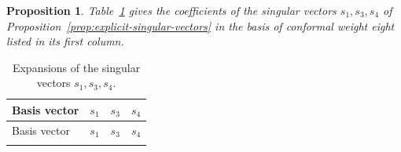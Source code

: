 \documentclass[11pt]{amsart}
\numberwithin{equation}{section}
\newtheorem{proposition}[theorem]{Proposition}
\theoremstyle{definition}
\theoremstyle{remark}
\begin{document}
\begin{proposition}\label{prop:pbw-singular-vectors}
Table~\ref{tab:weight-eight-pbw} gives the coefficients of the singular
vectors $s_1,s_3,s_4$ of Proposition~\ref{prop:explicit-singular-vectors}
in the basis of conformal weight eight listed in its first column.
\end{proposition}
\begingroup
\small
\renewcommand{\arraystretch}{1.15}
\setlength{\LTleft}{\fill}
\setlength{\LTright}{\fill}

\begin{longtable}{@{}lrrr@{}}
	\caption{Expansions of the singular vectors
		$s_1,s_3,s_4$.}
\label{tab:weight-eight-pbw}\\
\toprule
Basis vector & $s_1$ & $s_3$ & $s_4$\\
\midrule
\endfirsthead

\toprule
Basis vector & $s_1$ & $s_3$ & $s_4$\\
\midrule
\endhead

\endfoot
\bottomrule
\endlastfoot


\end{longtable}
\end{document}
